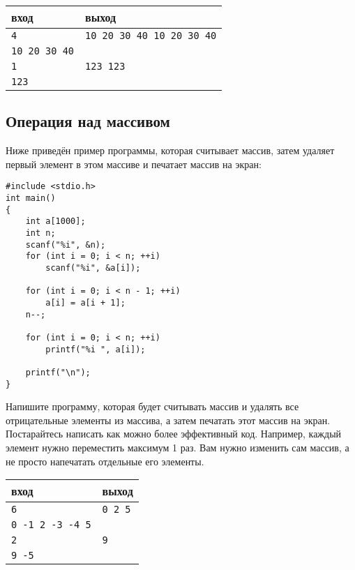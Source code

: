\documentclass{article}
\begin{document}
\begin{center}
\begin{tabular}{ l | l }
 вход & выход \\ \hline
 \texttt{4} & \texttt{10 20 30 40 10 20 30 40}  \\  
 \texttt{10 20 30 40} &  \\ \hline
 \texttt{1} & \texttt{123 123}  \\  
 \texttt{123} &  \\ 
\end{tabular}
\end{center}

\subsection{Операция над массивом}
Ниже приведён пример программы, которая считывает массив, затем удаляет первый элемент в этом массиве и печатает массив на экран:
\begin{lstlisting}
#include <stdio.h>
int main() 
{
    int a[1000];
    int n;
    scanf("%i", &n);
    for (int i = 0; i < n; ++i)
        scanf("%i", &a[i]);
 
    for (int i = 0; i < n - 1; ++i)
        a[i] = a[i + 1];
    n--;    
    
    for (int i = 0; i < n; ++i)
        printf("%i ", a[i]);

    printf("\n");
}
\end{lstlisting}
Напишите программу, которая будет считывать массив и удалять все отрицательные элементы из массива, а затем печатать этот массив на экран. Постарайтесь написать как можно более эффективный код. Например, каждый элемент нужно переместить максимум 1 раз. Вам нужно изменить сам массив, а не просто напечатать отдельные его элементы.
\begin{center}
\begin{tabular}{ l | l }
 вход & выход \\ \hline
 \texttt{6} & \texttt{0 2 5}  \\  
 \texttt{0 -1 2 -3 -4 5} &  \\ \hline
 \texttt{2} & \texttt{9}  \\  
 \texttt{9 -5} &  \\ 
\end{tabular}
\end{center}
\end{document}
